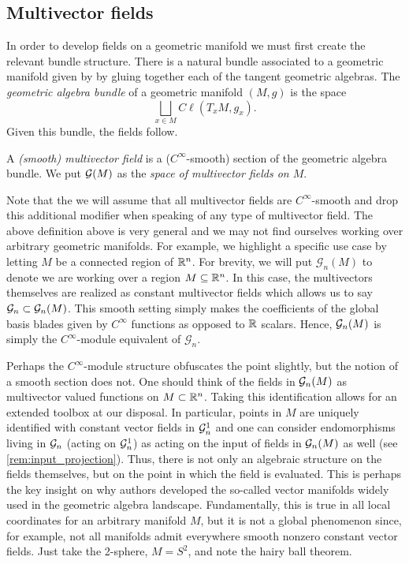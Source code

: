 \subsection{Multivector fields}

In order to develop fields on a geometric manifold we must first create the relevant bundle structure. There is a natural bundle associated to a  geometric manifold given by by gluing together each of the tangent geometric algebras. The \emph{geometric algebra bundle} of a geometric manifold $(M,g)$ is the space
\begin{equation}
\bigsqcup_{x \in M} C\ell(T_xM,g_x).
\end{equation}
Given this bundle, the fields follow.
\begin{definition}
A \emph{(smooth) multivector field} is a ($C^{\infty}$-smooth) section of the geometric algebra bundle. We put $\mathcal{G}(M)$ as the \emph{space of multivector fields on $M$}.
\end{definition}
Note that the we will assume that all multivector fields are $C^\infty$-smooth and drop this additional modifier when speaking of any type of multivector field. The above definition above is very general and we may not find ourselves working over arbitrary geometric manifolds. For example, we highlight a specific use case by letting $M$ be a connected region of $\mathbb{R}^n$. For brevity, we will put $\mathcal{G}_n(M)$ to denote we are working over a region $M\subseteq \mathbb{R}^n$. In this case, the multivectors themselves are realized as constant multivector fields which allows us to say $\mathcal{G}_n \subset \mathcal{G}_n(M)$. This smooth setting simply makes the coefficients of the global basis blades given by $C^\infty$ functions as opposed to $\mathbb{R}$ scalars.  Hence, $\mathcal{G}_n(M)$ is simply the $C^{\infty}$-module equivalent of $\mathcal{G}_n$.

Perhaps the $C^\infty$-module structure obfuscates the point slightly, but the notion of a smooth section does not.  One should think of the fields in $\mathcal{G}_n(M)$ as multivector valued functions on $M \subset \mathbb{R}^n$. Taking this identification allows for an extended toolbox at our disposal. In particular, points in $M$ are uniquely identified with constant vector fields in $\mathcal{G}_n^1$ and one can consider endomorphisms living in $\mathcal{G}_n$ (acting on $\mathcal{G}_n^1$) as acting on the input of fields in $\mathcal{G}_n(M)$ as well (see \cref{rem:input_projection}).  Thus, there is not only an algebraic structure on the fields themselves, but on the point in which the field is evaluated.  This is perhaps the key insight on why authors developed the so-called vector manifolds widely used in the geometric algebra landscape. Fundamentally, this is true in all local coordinates for an arbitrary manifold $M$, but it is not a global phenomenon since, for example, not all manifolds admit everywhere smooth nonzero constant vector fields. Just take the 2-sphere, $M=S^2$, and note the hairy ball theorem.

